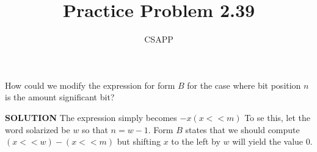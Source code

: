 \documentclass{article}
\title{Practice Problem 2.39}
\author{CSAPP}
\begin{document}
    \maketitle
    \begin{flushleft}
        How could we modify the expression for form $B$ for the case
        where bit position $n$ is the amount significant bit?\\
        \smallskip

        \textbf{\small SOLUTION}
        The expression simply becomes $-x(x << m)$ To se this, let the word solarized
        be $w$ so that $n = w - 1$. Form $B$ states that we should compute $(x << w) - (x << m)$
        but shifting $x$ to the left by $w$ will yield the value $0$.

    \end{flushleft}
\end{document}
